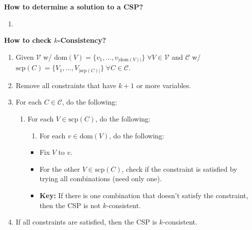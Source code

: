 \begin{process} \textbf{How to determine a solution to a CSP?}
    \begin{enumerate}
        \item 
    \end{enumerate}
\end{process}

\begin{example}
\end{example}
\newpage

\begin{process} \textbf{How to check $k$-Consistency?} 
    \begin{enumerate}
        \item Given $\mathcal{V}$ w/ $\text{dom}(V) = \{v_1,\ldots,v_{|\text{dom}(V)|}\} \; \forall V \in \mathcal{V}$ and $\mathcal{C}$ w/ $\text{scp}(C) = \{V_1,\ldots,V_{|\text{scp}(C)|}\} \; \forall C \in \mathcal{C}$.
        \item Remove all constraints that have $k+1$ or more variables.
        \item For each $C \in \mathcal{C}$, do the following:
        \begin{enumerate}
            \item For each $V \in \text{scp}(C)$, do the following:
            \begin{enumerate}
                \item For each $v \in \text{dom}(V)$, do the following:
            \end{enumerate}
            \begin{itemize}
                \item Fix $V$ to $v$.
                \item For the other $V \in \text{scp}(C)$, check if the constraint is satisfied by trying all combinations (need only one). 
                \item \textbf{Key:} If there is one combination that doesn't satisfy the constraint, then the CSP is not $k$-consistent.
            \end{itemize}
        \end{enumerate}
        \item If all constraints are satisfied, then the CSP is $k$-consistent.
    \end{enumerate}
\end{process}

